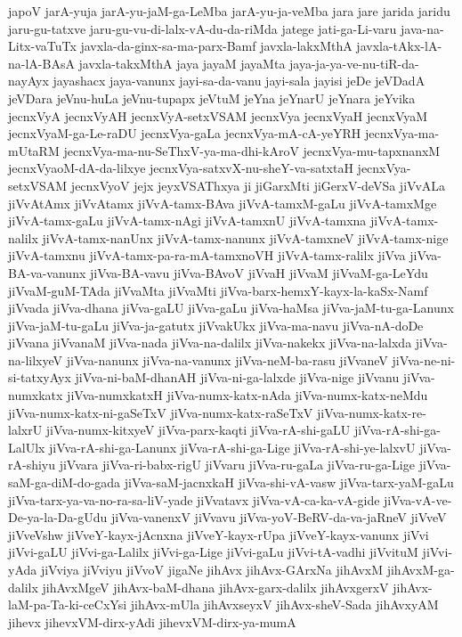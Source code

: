 {japoV
jarA-yuja
jarA-yu-jaM-ga-LeMba
jarA-yu-ja-veMba
jara
jare
jarida
jaridu
jaru-gu-tatxve
jaru-gu-vu-di-lalx-vA-du-da-riMda
jatege
jati-ga-Li-varu
java-na-Litx-vaTuTx
javxla-da-ginx-sa-ma-parx-Bamf
javxla-lakxMthA
javxla-tAkx-lA-na-lA-BAsA
javxla-takxMthA
jaya
jayaM
jayaMta
jaya-ja-ya-ve-nu-tiR-da-nayAyx
jayashacx
jaya-vanunx
jayi-sa-da-vanu
jayi-sala
jayisi
jeDe
jeVDadA
jeVDara
jeVnu-huLa
jeVnu-tupapx
jeVtuM
jeYna
jeYnarU
jeYnara
jeYvika
jecnxVyA
jecnxVyAH
jecnxVyA-setxVSAM
jecnxVya
jecnxVyaH
jecnxVyaM
jecnxVyaM-ga-Le-raDU
jecnxVya-gaLa
jecnxVya-mA-cA-yeYRH
jecnxVya-ma-mUtaRM
jecnxVya-ma-nu-SeThxV-ya-ma-dhi-kAroV
jecnxVya-mu-tapxnanxM
jecnxVyaoM-dA-da-lilxye
jecnxVya-satxvX-nu-sheY-va-satxtaH
jecnxVya-setxVSAM
jecnxVyoV
jejx
jeyxVSAThxya
ji
jiGarxMti
jiGerxV-deVSa
jiVvALa
jiVvAtAmx
jiVvAtamx
jiVvA-tamx-BAva
jiVvA-tamxM-gaLu
jiVvA-tamxMge
jiVvA-tamx-gaLu
jiVvA-tamx-nAgi
jiVvA-tamxnU
jiVvA-tamxna
jiVvA-tamx-nalilx
jiVvA-tamx-nanUnx
jiVvA-tamx-nanunx
jiVvA-tamxneV
jiVvA-tamx-nige
jiVvA-tamxnu
jiVvA-tamx-pa-ra-mA-tamxnoVH
jiVvA-tamx-ralilx
jiVva
jiVva-BA-va-vanunx
jiVva-BA-vavu
jiVva-BAvoV
jiVvaH
jiVvaM
jiVvaM-ga-LeYdu
jiVvaM-guM-TAda
jiVvaMta
jiVvaMti
jiVva-barx-hemxY-kayx-la-kaSx-Namf
jiVvada
jiVva-dhana
jiVva-gaLU
jiVva-gaLu
jiVva-haMsa
jiVva-jaM-tu-ga-Lanunx
jiVva-jaM-tu-gaLu
jiVva-ja-gatutx
jiVvakUkx
jiVva-ma-navu
jiVva-nA-doDe
jiVvana
jiVvanaM
jiVva-nada
jiVva-na-dalilx
jiVva-nakekx
jiVva-na-lalxda
jiVva-na-lilxyeV
jiVva-nanunx
jiVva-na-vanunx
jiVva-neM-ba-rasu
jiVvaneV
jiVva-ne-ni-si-tatxyAyx
jiVva-ni-baM-dhanAH
jiVva-ni-ga-lalxde
jiVva-nige
jiVvanu
jiVva-numxkatx
jiVva-numxkatxH
jiVva-numx-katx-nAda
jiVva-numx-katx-neMdu
jiVva-numx-katx-ni-gaSeTxV
jiVva-numx-katx-raSeTxV
jiVva-numx-katx-re-lalxrU
jiVva-numx-kitxyeV
jiVva-parx-kaqti
jiVva-rA-shi-gaLU
jiVva-rA-shi-ga-LalUlx
jiVva-rA-shi-ga-Lanunx
jiVva-rA-shi-ga-Lige
jiVva-rA-shi-ye-lalxvU
jiVva-rA-shiyu
jiVvara
jiVva-ri-babx-rigU
jiVvaru
jiVva-ru-gaLa
jiVva-ru-ga-Lige
jiVva-saM-ga-diM-do-gada
jiVva-saM-jacnxkaH
jiVva-shi-vA-vasw
jiVva-tarx-yaM-gaLu
jiVva-tarx-ya-va-no-ra-sa-liV-yade
jiVvatavx
jiVva-vA-ca-ka-vA-gide
jiVva-vA-ve-De-ya-la-Da-gUdu
jiVva-vanenxV
jiVvavu
jiVva-yoV-BeRV-da-va-jaRneV
jiVveV
jiVveVshw
jiVveY-kayx-jAcnxna
jiVveY-kayx-rUpa
jiVveY-kayx-vanunx
jiVvi
jiVvi-gaLU
jiVvi-ga-Lalilx
jiVvi-ga-Lige
jiVvi-gaLu
jiVvi-tA-vadhi
jiVvituM
jiVvi-yAda
jiVviya
jiVviyu
jiVvoV
jigaNe
jihAvx
jihAvx-GArxNa
jihAvxM
jihAvxM-ga-dalilx
jihAvxMgeV
jihAvx-baM-dhana
jihAvx-garx-dalilx
jihAvxgerxV
jihAvx-laM-pa-Ta-ki-ceCxYsi
jihAvx-mUla
jihAvxseyxV
jihAvx-sheV-Sada
jihAvxyAM
jihevx
jihevxVM-dirx-yAdi
jihevxVM-dirx-ya-mumA
}
